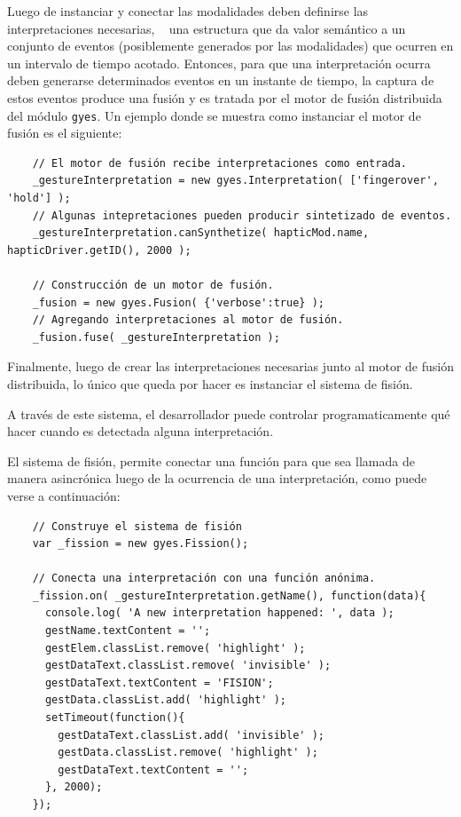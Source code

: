 Luego de instanciar y conectar las modalidades deben definirse las interpretaciones necesarias, \ie~ una estructura que da valor semántico a un conjunto de eventos (posiblemente generados por las modalidades) que ocurren en un intervalo de tiempo acotado. Entonces, para que una interpretación ocurra deben generarse determinados eventos en un instante de tiempo, la captura de estos eventos produce una fusión y es tratada por el motor de fusión distribuida del módulo \texttt{gyes}. Un ejemplo donde se muestra como instanciar el motor de fusión es el siguiente:

\begin{lstlisting}
    // El motor de fusión recibe interpretaciones como entrada.
    _gestureInterpretation = new gyes.Interpretation( ['fingerover', 'hold'] );
    // Algunas intepretaciones pueden producir sintetizado de eventos.
    _gestureInterpretation.canSynthetize( hapticMod.name, hapticDriver.getID(), 2000 );

    // Construcción de un motor de fusión.
    _fusion = new gyes.Fusion( {'verbose':true} );
    // Agregando interpretaciones al motor de fusión.
    _fusion.fuse( _gestureInterpretation );
\end{lstlisting}

Finalmente, luego de crear las interpretaciones necesarias junto al motor de fusión distribuida, lo único que queda por hacer es instanciar el sistema de fisión.

A través de este sistema, el desarrollador puede controlar programaticamente qué hacer cuando es detectada alguna interpretación. 

El sistema de fisión, permite conectar una función para que sea llamada de manera asincrónica luego de la ocurrencia de una interpretación, como puede verse a continuación:

\begin{lstlisting}
    // Construye el sistema de fisión
    var _fission = new gyes.Fission();
    
    // Conecta una interpretación con una función anónima.
    _fission.on( _gestureInterpretation.getName(), function(data){
      console.log( 'A new interpretation happened: ', data );
      gestName.textContent = '';
      gestElem.classList.remove( 'highlight' );
      gestDataText.classList.remove( 'invisible' );
      gestDataText.textContent = 'FISION';
      gestData.classList.add( 'highlight' );
      setTimeout(function(){
        gestDataText.classList.add( 'invisible' );
        gestData.classList.remove( 'highlight' );
        gestDataText.textContent = '';
      }, 2000);
    });
\end{lstlisting}

